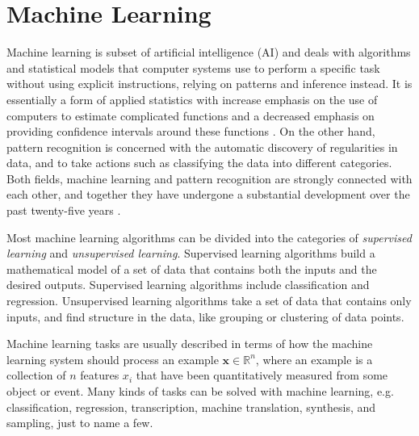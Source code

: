 \documentclass{scrartcl}
\begin{document}




\newpage

\section{Machine Learning}
\label{sec:machine_learning}

Machine learning is subset of artificial intelligence (AI) and deals with algorithms and statistical models that computer systems use to perform a specific task without using explicit instructions, relying on patterns and inference instead. It is essentially a form of applied statistics with increase emphasis on the use of computers to estimate complicated functions and a decreased emphasis on providing confidence intervals around these functions \cite{Goodfellow2016}. On the other hand, pattern recognition is concerned with the automatic discovery of regularities in data, and to take actions such as classifying the data into different categories. Both fields, machine learning and pattern recognition are strongly connected with each other, and together they have undergone a substantial development over the past twenty-five years \cite{Bishop2006}.

Most machine learning algorithms can be divided into the categories of \emph{supervised learning} and \emph{unsupervised learning}. Supervised learning algorithms build a mathematical model of a set of data that contains both the inputs and the desired outputs. Supervised learning algorithms include classification and regression. Unsupervised learning algorithms take a set of data that contains only inputs, and find structure in the data, like grouping or clustering of data points. 

Machine learning tasks are usually described in terms of how the machine learning system should process an example $\mathbf x \in \mathbb R^n$, where an example is a collection of $n$ features $x_i$ that have been quantitatively measured from some object or event. Many kinds of tasks can be solved with machine learning, e.g. classification, regression, transcription, machine translation, synthesis, and sampling, just to name a few.
\end{document}
